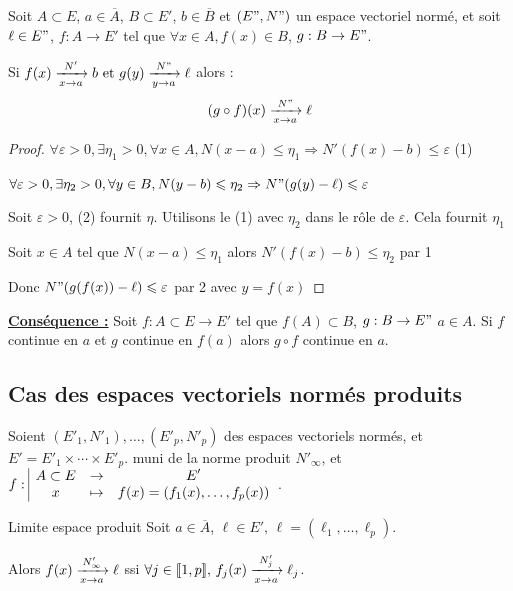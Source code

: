\begin{proposition}{}{}
    Soit $A \subset E$, $a \in \overline A$, $B \subset E'$, $b \in \overline B$ et 
    $(E", N")$ un espace vectoriel normé, et soit $\ell \in E"$, $f : A \to E'$ tel que $\forall x \in A, f(x) \in B$, $g: B \to E"$. 

    Si $f(x) \limitnorme{N'}x a b \text{ et } g(y) \limitnorme{N"}y a \ell$ alors :
    \[(g \circ f )(x) \limitnorme{N"} x a \ell\]
\end{proposition}

\begin{proof}
    $\forall \varepsilon > 0, \exists \eta_1 > 0, \forall x \in A, N(x - a) \leqslant \eta_1 \Rightarrow N'(f(x) - b) \leqslant \varepsilon$ (1)

    $\forall \varepsilon > 0, \exists \eta_2 > 0, \forall y \in B, N(y - b) \leqslant \eta_2 \Rightarrow N"(g(y) - \ell) \leqslant \varepsilon$

    Soit $\varepsilon > 0$, (2) fournit $\eta$. Utilisons le (1) avec $\eta_2$ dans le rôle 
    de $\varepsilon$. Cela fournit $\eta_1$

    Soit $x \in A$ tel que $N(x - a) \leqslant \eta_1$ alors $N'(f(x) - b) \leqslant \eta_2$ par 1

    Donc $N"(g(f(x)) - \ell) \leqslant \varepsilon$ par 2 avec $y = f(x)$
\end{proof}

\textbf{\uline{Conséquence :}}
Soit $f : A \subset E \to E'$ tel que $f(A) \subset B$, $g : B \to E"$ $a \in A$. Si $f$ continue en $a$ et $g$ continue en $f(a)$ alors $g \circ f$ continue en $a$.

\subsection{Cas des espaces vectoriels normés produits}

Soient $(E'_1, N'_1), \ldots, (E'_p, N'_p)$ des espaces vectoriels normés, et $E' = E'_1 \times \cdots \times E'_p$.
muni de la norme produit $N'_\infty$, et $\fonction{f}{A\subset E}{E'}{x}{f(x) = (f_1(x), \ldots, f_p(x))}$.


\begin{proposition}{Limite espace produit}{}
    Soit $a \in \overline A$, $\ell \in E', \, \ell = (\ell_1, \ldots, \ell_p)$.

    Alors $f(x) \limitnorme{N'_\infty}{x}{a} \ell$ ssi $\forall j \in \ninter{1}{p}, \, f_j(x) \limitnorme{N'_j}{x}{a} \ell_j$.

\end{proposition}

